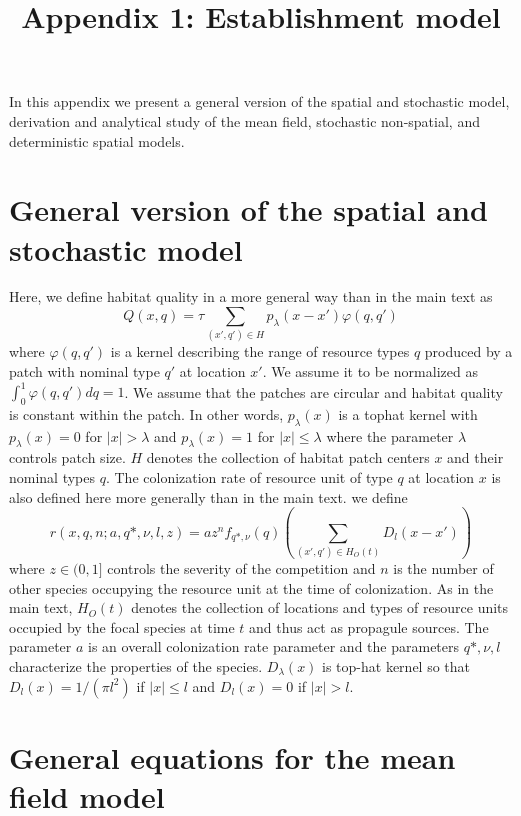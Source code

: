 \documentclass[8pt,a4paper]{article}
\title{Appendix 1: Establishment model}
\author{ }
\author{}
\date{\vspace{-5ex}}
\begin{document}

\maketitle
In this appendix we present a general version of the spatial and stochastic model, derivation and analytical study of the mean field, stochastic non-spatial, and deterministic spatial models.

\section{General version of the spatial and stochastic model}
Here, we define habitat quality in a more general way than in the main text as 
\begin{equation*}
Q(x,q) = \tau \sum_{(x' ,q') \in H} p_{\lambda} (x - x') \varphi(q,q')
\end{equation*}
where $\varphi(q,q')$ is a kernel describing the range of resource types $q$ produced by a patch with nominal type $q'$ at location $x'$. 
We assume it to be normalized as $\int_0^1 \varphi(q,q')dq = 1$. 
We assume that the patches are circular and habitat quality is constant within the patch. 
In other words, $p_{\lambda}(x)$ is a tophat kernel with $p_{\lambda}(x) = 0$ for  $| x | >\lambda$  and $p_{\lambda}(x) = 1$  for $|x| \leq \lambda$ where the parameter $\lambda$ controls patch size. 
$H$ denotes the collection of habitat patch centers $x$ and their nominal types $q$.
The colonization rate of resource unit of type $q$ at location $x$ is also defined here more generally than in the main text.
we define 
\begin{equation*}
r(x,q,n; a, q*,\nu, l, z) = a z^n f_{q*, \nu}  (q)\left( \sum_{(x' ,q') \in H_O(t)} D_l(x - x') \right)
\end{equation*} 
where $z \in (0,1]$ controls the severity of the competition and $n$ is the number of other species occupying the resource unit at the time of colonization.
As in the main text, $H_O(t)$ denotes the collection of locations and types of resource units occupied by the focal species  at time $t$ and thus act as propagule sources.
The parameter $a$ is an overall colonization rate parameter and the parameters $q*,\nu , l$ characterize the properties of the species.
$D_{\lambda} (x)$ is top-hat kernel so that $D_l(x) = 1/(\pi l^2)$ if $|x| \leq l$ and $D_l(x) = 0$ if $|x| >  l$. 


\section{General equations for the mean field model}
\end{document}

